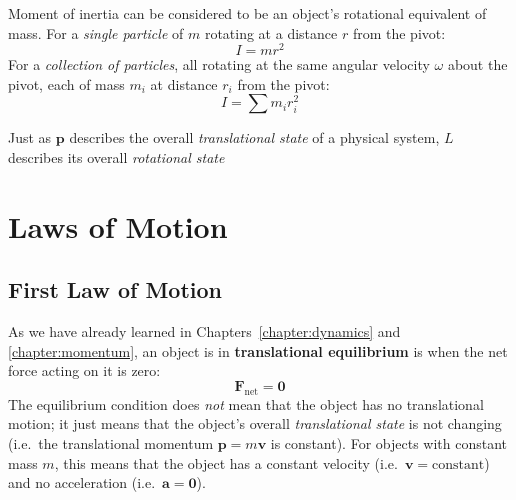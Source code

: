 Moment of inertia can be considered to be an object's rotational equivalent of
mass. For a \emph{single particle} of $m$ rotating at a distance $r$ from the
pivot:
\begin{equation}
  \boxed{I=mr^2}
\end{equation}
For a \emph{collection of particles}, all rotating at the same angular
velocity $\omega$ about the pivot, each of mass $m_i$ at distance $r_i$ from
the pivot:
\begin{equation}
  \boxed{I=\sum m_ir_i^2}
\end{equation}
%
%
%
%
%
%
%
%
%
%
%  

Just as $\bm p$ describes the overall \emph{translational state} of a
physical system, $L$ describes its overall \emph{rotational state}




\section{Laws of Motion}

\subsection{First Law of Motion}
As we have already learned in Chapters~\ref{chapter:dynamics} and
\ref{chapter:momentum}, an object is in \textbf{translational equilibrium} is
when the net force acting on it is zero:
\begin{equation*}
  \bm F_\text{net}=\bm 0
\end{equation*}
The equilibrium condition does \emph{not} mean that the object has no
translational motion; it just means that the object's overall
\emph{translational state} is not changing (i.e.\ the translational momentum
$\bm p=m\bm v$ is constant). For objects with constant mass $m$, this means
that the object has a constant velocity (i.e.\ $\bm v=\text{constant}$) and
no acceleration (i.e.\ $\bm a=\bm 0$).

